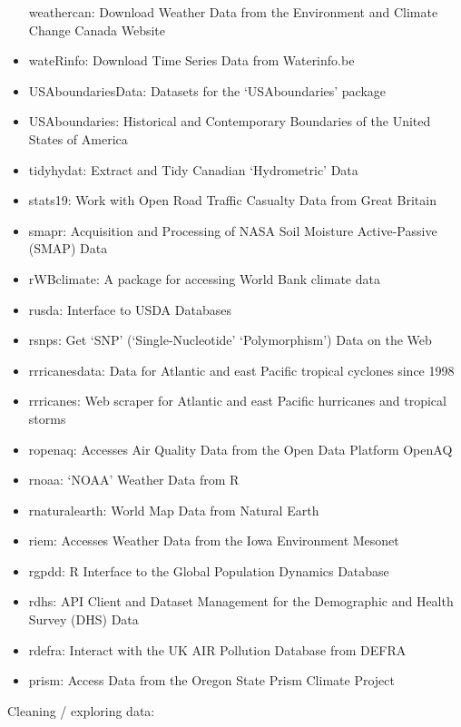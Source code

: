 \documentclass[]{tufte-book}
\begin{document}
\begin{itemize}
  weathercan: Download Weather Data from the Environment and Climate Change Canada Website
\item
  wateRinfo: Download Time Series Data from Waterinfo.be
\item
  USAboundariesData: Datasets for the `USAboundaries' package
\item
  USAboundaries: Historical and Contemporary Boundaries of the United States of America
\item
  tidyhydat: Extract and Tidy Canadian `Hydrometric' Data
\item
  stats19: Work with Open Road Traffic Casualty Data from Great Britain
\item
  smapr: Acquisition and Processing of NASA Soil Moisture Active-Passive (SMAP) Data
\item
  rWBclimate: A package for accessing World Bank climate data
\item
  rusda: Interface to USDA Databases
\item
  rsnps: Get `SNP' (`Single-Nucleotide' `Polymorphism') Data on the Web
\item
  rrricanesdata: Data for Atlantic and east Pacific tropical cyclones since 1998
\item
  rrricanes: Web scraper for Atlantic and east Pacific hurricanes and tropical storms
\item
  ropenaq: Accesses Air Quality Data from the Open Data Platform OpenAQ
\item
  rnoaa: `NOAA' Weather Data from R
\item
  rnaturalearth: World Map Data from Natural Earth
\item
  riem: Accesses Weather Data from the Iowa Environment Mesonet
\item
  rgpdd: R Interface to the Global Population Dynamics Database
\item
  rdhs: API Client and Dataset Management for the Demographic and Health Survey (DHS) Data
\item
  rdefra: Interact with the UK AIR Pollution Database from DEFRA
\item
  prism: Access Data from the Oregon State Prism Climate Project
\end{itemize}

Cleaning / exploring data:
\end{document}
